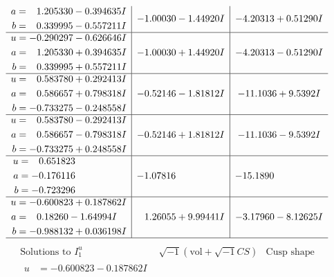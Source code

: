\documentclass[1p]{elsarticle_modified}
\theoremstyle{definition}
\newcommand{\I}{\sqrt{-1}}
\begin{document}
$$\begin{array}{c|c|c}
\begin{aligned}
a &= \phantom{-}1.205330 - 0.394635 I \\
b &= \phantom{-}0.339995 - 0.557211 I\end{aligned}
 & -1.00030 - 1.44920 I & -4.20313 + 0.51290 I \\ \hline\begin{aligned}
u &= -0.290297 - 0.626646 I \\
a &= \phantom{-}1.205330 + 0.394635 I \\
b &= \phantom{-}0.339995 + 0.557211 I\end{aligned}
 & -1.00030 + 1.44920 I & -4.20313 - 0.51290 I \\ \hline\begin{aligned}
u &= \phantom{-}0.583780 + 0.292413 I \\
a &= \phantom{-}0.586657 + 0.798318 I \\
b &= -0.733275 - 0.248558 I\end{aligned}
 & -0.52146 - 1.81812 I & -11.1036 + 9.5392 I \\ \hline\begin{aligned}
u &= \phantom{-}0.583780 - 0.292413 I \\
a &= \phantom{-}0.586657 - 0.798318 I \\
b &= -0.733275 + 0.248558 I\end{aligned}
 & -0.52146 + 1.81812 I & -11.1036 - 9.5392 I \\ \hline\begin{aligned}
u &= \phantom{-}0.651823\phantom{ +0.000000I} \\
a &= -0.176116\phantom{ +0.000000I} \\
b &= -0.723296\phantom{ +0.000000I}\end{aligned}
 & -1.07816\phantom{ +0.000000I} & -15.1890\phantom{ +0.000000I} \\ \hline\begin{aligned}
u &= -0.600823 + 0.187862 I \\
a &= \phantom{-}0.18260 - 1.64994 I \\
b &= -0.988132 + 0.036198 I\end{aligned}
 & \phantom{-}1.26055 + 9.99441 I & -3.17960 - 8.12625 I\\
 \hline 
 \end{array}$$\newpage$$\begin{array}{c|c|c}  
\text{Solutions to }I^u_{1}& \I (\text{vol} + \sqrt{-1}CS) & \text{Cusp shape}\\
 \hline 
\begin{aligned}
u &= -0.600823 - 0.187862 I \\

\end{aligned}
\end{array}$$
\end{document}
